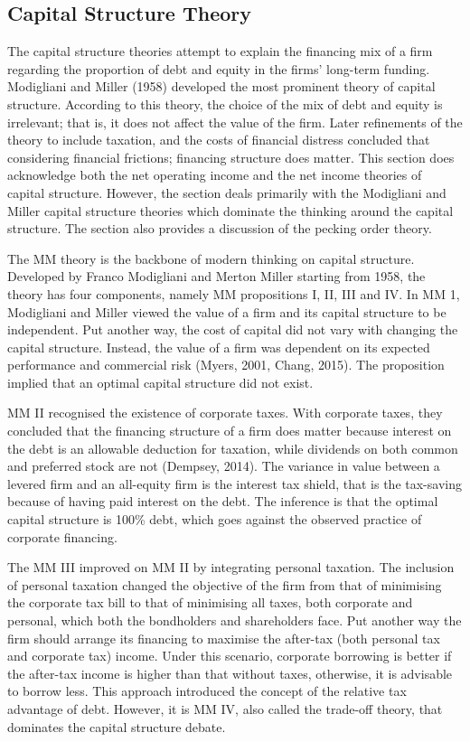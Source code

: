 \documentclass[a4paper, nobind]{templates/ociamthesis}
\begin{document}
\hypertarget{capital-structure-theory}{%
\subsection{Capital Structure Theory}\label{capital-structure-theory}}

\noindent The capital structure theories attempt to explain the financing mix of a firm regarding the proportion of debt and equity in the firms' long-term funding. Modigliani and Miller (1958) developed the most prominent theory of capital structure. According to this theory, the choice of the mix of debt and equity is irrelevant; that is, it does not affect the value of the firm. Later refinements of the theory to include taxation, and the costs of financial distress concluded that considering financial frictions; financing structure does matter. This section does acknowledge both the net operating income and the net income theories of capital structure. However, the section deals primarily with the Modigliani and Miller capital structure theories which dominate the thinking around the capital structure. The section also provides a discussion of the pecking order theory.

The MM theory is the backbone of modern thinking on capital structure. Developed by Franco Modigliani and Merton Miller starting from 1958, the theory has four components, namely MM propositions I, II, III and IV. In MM 1, Modigliani and Miller viewed the value of a firm and its capital structure to be independent. Put another way, the cost of capital did not vary with changing the capital structure. Instead, the value of a firm was dependent on its expected performance and commercial risk (Myers, 2001, Chang, 2015). The proposition implied that an optimal capital structure did not exist.

MM II recognised the existence of corporate taxes. With corporate taxes, they concluded that the financing structure of a firm does matter because interest on the debt is an allowable deduction for taxation, while dividends on both common and preferred stock are not (Dempsey, 2014). The variance in value between a levered firm and an all-equity firm is the interest tax shield, that is the tax-saving because of having paid interest on the debt. The inference is that the optimal capital structure is 100\% debt, which goes against the observed practice of corporate financing.

The MM III improved on MM II by integrating personal taxation. The inclusion of personal taxation changed the objective of the firm from that of minimising the corporate tax bill to that of minimising all taxes, both corporate and personal, which both the bondholders and shareholders face. Put another way the firm should arrange its financing to maximise the after-tax (both personal tax and corporate tax) income. Under this scenario, corporate borrowing is better if the after-tax income is higher than that without taxes, otherwise, it is advisable to borrow less. This approach introduced the concept of the relative tax advantage of debt. However, it is MM IV, also called the trade-off theory, that dominates the capital structure debate.
\end{document}
